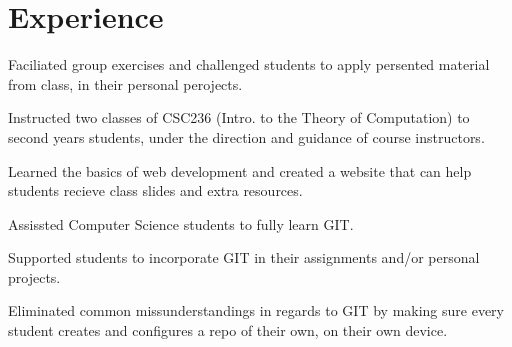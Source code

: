 \documentclass[]{dans-resume}
\begin{document}
\hfill
\begin{minipage}[t]{0.66\textwidth}

\section{Experience}

\vspace{\topsep} %
\begin{tightemize}
\item Faciliated group exercises and challenged students to apply persented material from class,
in their personal perojects.
\item Instructed two classes of CSC236 (Intro. to the Theory of
Computation) to second years students, under the direction and guidance of course instructors.
\item Learned the basics of web development and created a website that can help students
recieve class slides and extra resources.
\end{tightemize}




\begin{tightemize}
  \item Assissted Computer Science students to fully learn GIT.
  \item Supported students to incorporate GIT in their assignments
  and/or personal projects.
  \item Eliminated common missunderstandings in regards to GIT by making sure every student
  creates and configures a repo of their own, on their own device.
\end{tightemize}



\end{minipage}
\end{document}
